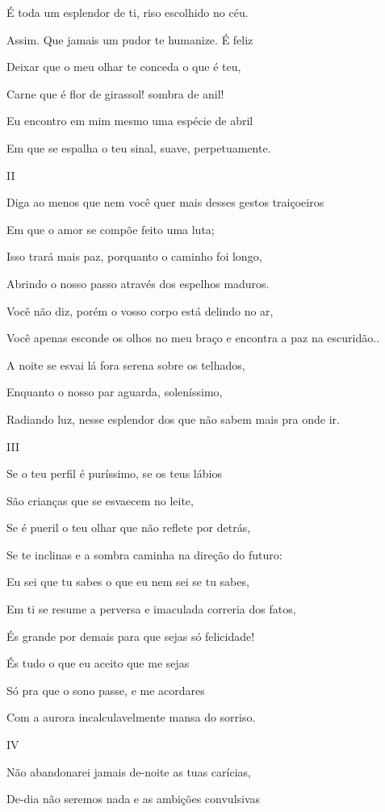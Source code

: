 É toda um esplendor de ti, riso escolhido no céu.

Assim. Que jamais um pudor te humanize. É feliz

Deixar que o meu olhar te conceda o que é teu,

Carne que é flor de girassol! sombra de anil!

Eu encontro em mim mesmo uma espécie de abril

Em que se espalha o teu sinal, suave, perpetuamente.

II

Diga ao menos que nem você quer mais desses gestos traiçoeiros

Em que o amor se compõe feito uma luta;

Isso trará mais paz, porquanto o caminho foi longo,

Abrindo o nosso passo através dos espelhos maduros.

Você não diz, porém o vosso corpo está delindo no ar,

Você apenas esconde os olhos no meu braço e encontra a paz na
escuridão..

A noite se esvai lá fora serena sobre os telhados,

Enquanto o nosso par aguarda, soleníssimo,

Radiando luz, nesse esplendor dos que não sabem mais pra onde ir.

III

Se o teu perfil é puríssimo, se os teus lábios

São crianças que se esvaecem no leite,

Se é pueril o teu olhar que não reflete por detrás,

Se te inclinas e a sombra caminha na direção do futuro:

Eu sei que tu sabes o que eu nem sei se tu sabes,

Em ti se resume a perversa e imaculada correria dos fatos,

És grande por demais para que sejas só felicidade!

És tudo o que eu aceito que me sejas

Só pra que o sono passe, e me acordares

Com a aurora incalculavelmente mansa do sorriso.

IV

Não abandonarei jamais de-noite as tuas carícias,

De-dia não seremos nada e as ambições convulsivas

